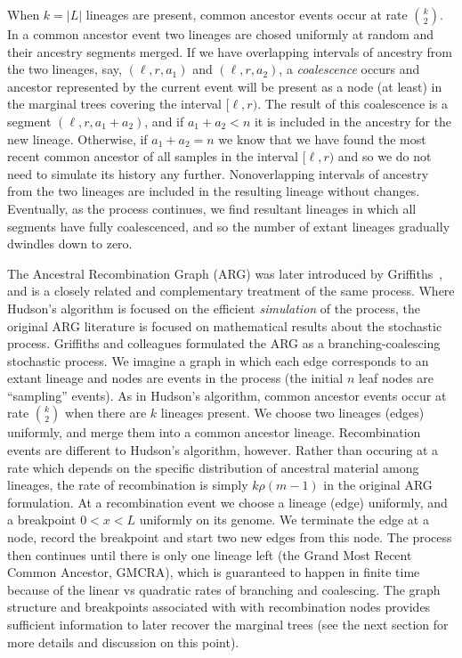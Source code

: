 \documentclass{article}
\begin{document}
When $k = |L|$ lineages are present, common ancestor events
occur at rate $\binom{k}{2}$. In a common ancestor event two lineages
are chosed uniformly at random and their ancestry segments merged.
If we have overlapping intervals of ancestry from the two lineages,
say, $(\ell, r, a_1)$ and $(\ell, r, a_2)$, a
\emph{coalescence} occurs and ancestor represented by the current event
will be present as a node (at least) in the marginal trees covering
the interval $[\ell, r)$. The result of this coalescence is a segment
$(\ell, r, a_1 + a_2)$, and if $a_1 + a_2 < n$ it is included in the
ancestry for the new lineage. Otherwise, if $a_1 + a_2 = n$ we know that
we have found the most recent common ancestor of all samples in
the interval $[\ell, r)$ and so we do not need to simulate its history any further.
Nonoverlapping intervals of ancestry from the two lineages are included
in the resulting lineage without changes. Eventually, as the process continues,
we find resultant lineages in which all segments have fully coalescenced,
and so the number of extant lineages gradually dwindles down to zero.

The Ancestral Recombination Graph (ARG) was later introduced by Griffiths~\citep{griffiths1991two,ethier1990two,griffiths1996ancestral,
griffiths1997ancestral}, and is a
closely related and complementary treatment of the same process. Where
Hudson's algorithm is focused on the efficient \emph{simulation} of the
process, the original ARG literature is focused on mathematical
results about the stochastic process. Griffiths and colleagues formulated the
ARG as a branching-coalescing stochastic process. We imagine a graph in which
each edge corresponds to an extant lineage and nodes are events in the
process (the initial $n$ leaf nodes are ``sampling'' events). As in Hudson's
algorithm, common ancestor events occur at rate $\binom{k}{2}$ when there
are $k$ lineages present. We choose two lineages (edges) uniformly, and merge them
into a common ancestor lineage. Recombination events are different
to Hudson's algorithm, however. Rather than occuring at a rate which depends on
the specific distribution of ancestral material among lineages, the
rate of recombination is simply $k \rho (m - 1)$ in the original ARG
formulation. At a recombination event we choose a lineage (edge) uniformly, and a
breakpoint $0 < x < L$ uniformly on its genome. We terminate the edge at a
node, record the breakpoint and start two new edges from this node. The process
then continues until there is only one lineage left (the Grand Most Recent
Common Ancestor, GMCRA), which is guaranteed to
happen in finite time because of the linear vs quadratic rates of branching
and coalescing. The graph structure and breakpoints associated with with
recombination nodes provides sufficient information to later recover the marginal
trees (see the next section for more details and discussion on this point).
\end{document}
